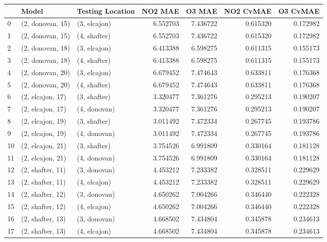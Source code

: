 \begin{tabular}{lllrrrr}
\toprule
{} &             Model & Testing Location &   NO2 MAE &    O3 MAE &  NO2 CvMAE &  O3 CvMAE \\
\midrule
0  &  (2, donovan, 15) &     (3, elcajon) &  6.552703 &  7.436722 &   0.615320 &  0.172982 \\
1  &  (2, donovan, 15) &     (4, shafter) &  6.552703 &  7.436722 &   0.615320 &  0.172982 \\
2  &  (2, donovan, 18) &     (3, elcajon) &  6.413388 &  6.598275 &   0.611315 &  0.155173 \\
3  &  (2, donovan, 18) &     (4, shafter) &  6.413388 &  6.598275 &   0.611315 &  0.155173 \\
4  &  (2, donovan, 20) &     (3, elcajon) &  6.679452 &  7.474643 &   0.633811 &  0.176368 \\
5  &  (2, donovan, 20) &     (4, shafter) &  6.679452 &  7.474643 &   0.633811 &  0.176368 \\
6  &  (2, elcajon, 17) &     (3, shafter) &  3.320477 &  7.361276 &   0.295213 &  0.190207 \\
7  &  (2, elcajon, 17) &     (4, donovan) &  3.320477 &  7.361276 &   0.295213 &  0.190207 \\
8  &  (2, elcajon, 19) &     (3, shafter) &  3.011492 &  7.472334 &   0.267745 &  0.193786 \\
9  &  (2, elcajon, 19) &     (4, donovan) &  3.011492 &  7.472334 &   0.267745 &  0.193786 \\
10 &  (2, elcajon, 21) &     (3, shafter) &  3.754526 &  6.991809 &   0.330164 &  0.181128 \\
11 &  (2, elcajon, 21) &     (4, donovan) &  3.754526 &  6.991809 &   0.330164 &  0.181128 \\
12 &  (2, shafter, 11) &     (3, donovan) &  4.453212 &  7.233382 &   0.328511 &  0.229629 \\
13 &  (2, shafter, 11) &     (4, elcajon) &  4.453212 &  7.233382 &   0.328511 &  0.229629 \\
14 &  (2, shafter, 12) &     (3, donovan) &  4.650262 &  7.004266 &   0.346440 &  0.222328 \\
15 &  (2, shafter, 12) &     (4, elcajon) &  4.650262 &  7.004266 &   0.346440 &  0.222328 \\
16 &  (2, shafter, 13) &     (3, donovan) &  4.668502 &  7.434804 &   0.345878 &  0.234613 \\
17 &  (2, shafter, 13) &     (4, elcajon) &  4.668502 &  7.434804 &   0.345878 &  0.234613 \\

\end{tabular}
